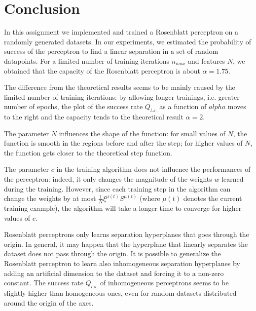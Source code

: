 \section{Conclusion}

In this assignment we implemented and trained a Rosenblatt perceptron on a randomly generated datasets.
In our experiments, we estimated the probability of success of the perceptron to find a linear separation in a set of random datapoints.
For a limited number of training iterations $n_{max}$ and features $N$, we obtained that the capacity of the Rosenblatt perceptron is about $\alpha = 1.75$.

The difference from the theoretical results seems to be mainly caused by the limited number of training iterations:
by allowing longer trainings, i.e. greater number of epochs, the plot of the success rate $Q_{l.s.}$ as a function of $alpha$ moves to the right and the capacity tends to the theoretical result $\alpha = 2$.

The parameter $N$ influences the shape of the function:
for small values of $N$, the function is smooth in the regions before and after the step;
for higher values of $N$, the function gets closer to the theoretical step function.

The parameter $c$ in the training algorithm does not influence the performances of the perceptron:
indeed, it only changes the magnitude of the weights $w$ learned during the training.
However, since each training step in the algorithm can change the weights by at most $\frac{1}{N}\xi^{\mu(t)} S^{\mu(t)}$ (where $\mu(t)$ denotes the current training example), the algorithm will take a longer time to converge for higher values of $c$.

Rosenblatt perceptrons only learns separation hyperplanes that goes through the origin.
In general, it may happen that the hyperplane that linearly separates the dataset does not pass through the origin.
It is possible to generalize the Rosenblatt perceptron to learn also inhomogeneous separation hyperplanes by adding an artificial dimension to the dataset and forcing it to a non-zero constant.
The success rate $Q_{l.s.}$ of inhomogeneous perceptrons seems to be slightly higher than homogeneous ones, even for random datasets distributed around the origin of the axes.
